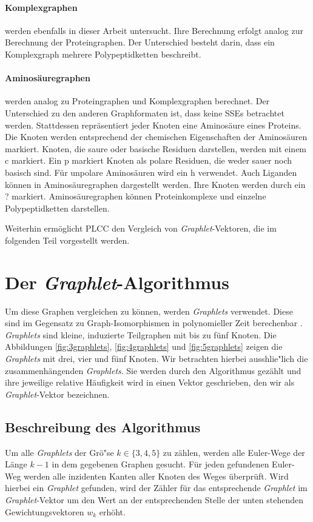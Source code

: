 \documentclass{report}
\begin{document}
\paragraph{Komplexgraphen}

werden ebenfalls in dieser Arbeit untersucht. Ihre Berechnung erfolgt analog zur Berechnung der Proteingraphen. Der Unterschied besteht darin, dass ein Komplexgraph mehrere Polypeptidketten beschreibt.

\paragraph{Aminos\"auregraphen} werden analog zu Proteingraphen und Komplexgraphen berechnet. Der Unterschied zu den anderen Graphformaten ist, dass keine SSEs betrachtet werden. Stattdessen repr\"asentiert jeder Knoten eine Aminos\"aure eines Proteins. Die Knoten werden entsprechend der chemischen Eigenschaften der Aminos\"auren markiert. Knoten, die saure oder basische Residuen darstellen, werden mit einem c markiert. Ein p markiert Knoten als polare Residuen, die weder sauer noch basisch sind. F\"ur unpolare Aminos\"auren wird ein h verwendet. Auch Liganden k\"onnen in Aminos\"auregraphen dargestellt werden. Ihre Knoten werden durch ein ? markiert. Aminos\"auregraphen k\"onnen Proteinkomplexe und einzelne Polypeptidketten darstellen.


Weiterhin erm\"oglicht PLCC den Vergleich von \textit{Graphlet}-Vektoren, die im folgenden Teil vorgestellt werden.


\section{Der \textit{Graphlet}-Algorithmus}


Um diese Graphen vergleichen zu k\"onnen, werden \textit{Graphlets} verwendet. Diese sind im Gegensatz zu Graph-Isomorphismen in polynomieller Zeit berechenbar \cite{sherv_graphlets}. \textit{Graphlets} sind kleine, induzierte Teilgraphen mit bis zu f\"unf Knoten. Die Abbildungen \ref{fig:3graphlets}, \ref{fig:4graphlets} und \ref{fig:5graphlets} zeigen die \textit{Graphlets} mit drei, vier und f\"unf Knoten. Wir betrachten hierbei ausshlie"lich die zusammenh\"angenden \textit{Graphlets}. Sie werden durch den Algorithmus gez\"ahlt und ihre jeweilige relative H\"aufigkeit wird in einen Vektor geschrieben, den wir als \textit{Graphlet}-Vektor bezeichnen.


\subsection{Beschreibung des Algorithmus}
Um alle \textit{Graphlets} der Gr\"o"se $k \in \{3,4,5\}$ zu z\"ahlen, werden alle Euler-Wege der L\"ange $k-1$ in dem gegebenen Graphen gesucht. F\"ur jeden gefundenen Euler-Weg werden alle inzidenten Kanten aller Knoten des Weges \"uberpr\"uft. Wird hierbei ein \textit{Graphlet} gefunden, wird der Z\"ahler f\"ur das entsprechende \textit{Graphlet} im \textit{Graphlet}-Vektor um den Wert an der entsprechenden Stelle der unten stehenden Gewichtungsvektoren $w_k$ erh\"oht.
\end{document}
